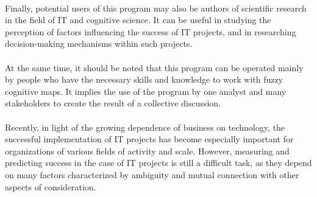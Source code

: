 \documentclass{article}
\begin{document}
\begin{minipage}{0.49\textwidth}
        ~\\
        Finally, potential users of this program may also be authors of scientific research in the field of IT and cognitive science. It can be useful in studying the perception of factors influencing the success of IT projects, and in researching decision-making mechanisms within such projects.\\
        ~\\
        At the same time, it should be noted that this program can be operated mainly by people who have the necessary skills and knowledge to work with fuzzy cognitive maps. It implies the use of the program by one analyst and many stakeholders to create the result of a collective discussion.\\
        ~\\
        Recently, in light of the growing dependence of business on technology, the successful implementation of IT projects has become especially important for organizations of various fields of activity and scale. However, measuring and predicting success in the case of IT projects is still a difficult task, as they depend on many factors characterized by ambiguity and mutual connection with other aspects of consideration.\\
        ~\\
        ~\\
        ~\\
        ~\\
        ~\\
        ~\\
        ~\\
        ~\\
        ~\\
        ~\\
        ~\\
        ~\\
        ~\\
        ~\\
        ~\\
        ~\\
        ~\\
        ~\\
        ~\\
        ~\\
        ~\\
        ~\\
        ~\\
        ~\\
        ~\\
        \end{minipage}
\end{document}
